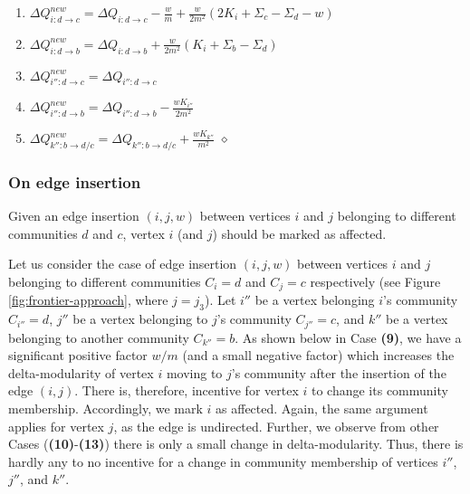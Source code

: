 \begin{enumerate}[start=4]
  \item $\Delta Q_{i:d \rightarrow c}^{new} = \Delta Q_{i:d \rightarrow c} - \frac{w}{m} + \frac{w}{2m^2} (2K_i + \Sigma_c - \Sigma_d - w)$
  \item $\Delta Q_{i:d \rightarrow b}^{new} = \Delta Q_{i:d \rightarrow b} + \frac{w}{2m^2} (K_i + \Sigma_b - \Sigma_d)$
  \item $\Delta Q_{i'':d \rightarrow c}^{new} = \Delta Q_{i'':d \rightarrow c}$
  \item $\Delta Q_{i'':d \rightarrow b}^{new} = \Delta Q_{i'':d \rightarrow b} - \frac{wK_{i''}}{2m^2}$
  \item $\Delta Q_{k'':b \rightarrow d/c}^{new} = \Delta Q_{k'':b \rightarrow d/c} + \frac{wK_{k''}}{m^2}$ \hfill $\diamond$
\end{enumerate}




\subsubsection{On edge insertion}

\begin{lemma}
\label{thm:louvain--mark-insertion}
Given an edge insertion $(i, j, w)$ between vertices $i$ and $j$ belonging to different communities $d$ and $c$, vertex $i$ (and $j$) should be marked as affected.
\end{lemma}

Let us consider the case of edge insertion $(i, j, w)$ between vertices $i$ and $j$ belonging to different communities $C_i = d$ and $C_j = c$ respectively (see Figure \ref{fig:frontier-approach}, where $j = j_3$). Let $i''$ be a vertex belonging $i$'s community $C_{i''} = d$, $j''$ be a vertex belonging to $j$'s community $C_{j''} = c$, and $k''$ be a vertex belonging to another community $C_{k''} = b$. As shown below in Case \textbf{(9)}, we have a significant positive factor $w/m$ (and a small negative factor) which increases the delta-modularity of vertex $i$ moving to $j$'s community after the insertion of the edge $(i, j)$. There is, therefore, incentive for vertex $i$ to change its community membership. Accordingly, we mark $i$ as affected. Again, the same argument applies for vertex $j$, as the edge is undirected. Further, we observe from other Cases (\textbf{(10)}-\textbf{(13)}) there is only a small change in delta-modularity. Thus, there is hardly any to no incentive for a change in community membership of vertices $i''$, $j''$, and $k''$.

